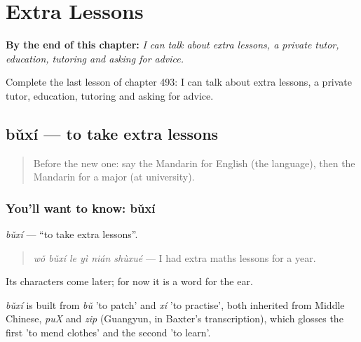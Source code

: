 
\chapter{Extra Lessons}
\label{ch:zh-extra-lessons}

\begin{chapteropening}
\textbf{By the end of this chapter:} \emph{I can talk about extra lessons, a private tutor, education, tutoring and asking for advice.}

Complete the last lesson of chapter 493: I can talk about extra lessons, a private tutor, education, tutoring and asking for advice.
\end{chapteropening}

\section[bǔxí]{bǔxí — to take extra lessons}

\label{lesson:ZH-C493-buxi}



\begin{quote}
Before the new one: say the Mandarin for English (the language), then the Mandarin for a major (at university).
\end{quote}

\subsection*{You'll want to know: bǔxí}
\emph{bǔxí} — \textquotedblleft{}to take extra lessons\textquotedblright{}.

\begin{quote}
\emph{wǒ bǔxí le yì nián shùxué} — I had extra maths lessons for a year.
\end{quote}

Its characters come later; for now it is a word for the ear.

\begin{cousinweb}
\emph{bǔxí} is built from \emph{bǔ} 'to patch' and \emph{xí} 'to practise', both inherited from Middle Chinese, \emph{puX} and \emph{zip} (Guangyun, in Baxter's transcription), which glosses the first 'to mend clothes' and the second 'to learn'.
\end{cousinweb}

